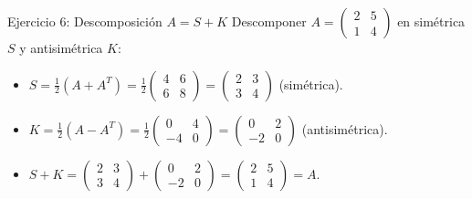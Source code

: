 \documentclass[11pt]{beamer}
\begin{document}
\begin{frame}{Ejercicio 6: Descomposición $A = S + K$}
  Descomponer $A = \begin{pmatrix} 2 & 5 \\ 1 & 4 \end{pmatrix}$ en simétrica $S$ y antisimétrica $K$:
  \begin{itemize}
    \item $S = \frac{1}{2}(A + A^T) = \frac{1}{2}\begin{pmatrix} 4 & 6 \\ 6 & 8 \end{pmatrix} = \begin{pmatrix} 2 & 3 \\ 3 & 4 \end{pmatrix}$ (simétrica).
    \item $K = \frac{1}{2}(A - A^T) = \frac{1}{2}\begin{pmatrix} 0 & 4 \\ -4 & 0 \end{pmatrix} = \begin{pmatrix} 0 & 2 \\ -2 & 0 \end{pmatrix}$ (antisimétrica).
    \item $S + K = \begin{pmatrix} 2 & 3 \\ 3 & 4 \end{pmatrix} + \begin{pmatrix} 0 & 2 \\ -2 & 0 \end{pmatrix} = \begin{pmatrix} 2 & 5 \\ 1 & 4 \end{pmatrix} = A$. \checkmark
  \end{itemize}
\end{frame}
\end{document}
